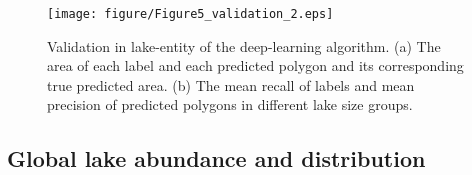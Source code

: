 \documentclass[preprint,12pt,authoryear]{elsarticle}
\begin{document}
\begin{figure}[h]
    \centering
    \texttt{[image: figure/Figure5\_validation\_2.eps]}
    \caption{Validation in lake-entity of the deep-learning algorithm. (a) The area of each label and each predicted polygon and its corresponding true predicted area. (b) The mean recall of labels and mean precision of predicted polygons in different lake size groups.}
    \label{fig:Fig5}
\end{figure}

\subsection{Global lake abundance and distribution}
\label{subsec32}

\end{document}
